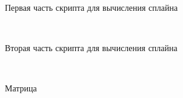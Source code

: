 \documentclass[russian,utf8,nocolumnxxxi,nocolumnxxxii]{eskdtext}
\begin{document}
\begin{figure}[H]
 \\
\caption{Первая часть скрипта для вычисления сплайна}
\end{figure}

\begin{figure}[H]
 \\
\caption{Вторая часть скрипта для вычисления сплайна}
\end{figure}

\begin{figure}[H]
 \\
\caption{Матрица }
\end{figure}
\end{document}
